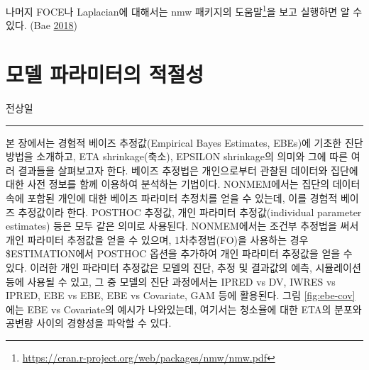 \documentclass[
  11pt,
  krantz2,
  a4paper]{krantz}
\theoremstyle{definition}
\theoremstyle{definition}
\theoremstyle{definition}
\theoremstyle{remark}
\begin{document}
나머지 FOCE나 Laplacian에 대해서는 nmw 패키지의 도움말\footnote{\url{https://cran.r-project.org/web/packages/nmw/nmw.pdf}}을 보고 실행하면 알 수 있다. (Bae \protect\hyperlink{ref-R-nmw}{2018})

\hypertarget{parameters}{%
\chapter{모델 파라미터의 적절성}\label{parameters}}

\Large\hfill

전상일
\normalsize

\begin{center}\rule{0.5\linewidth}{0.5pt}\end{center}

본 장에서는 경험적 베이즈 추정값(Empirical Bayes Estimates, EBEs)에 기초한 진단 방법을 소개하고, ETA shrinkage(축소), EPSILON shrinkage의 의미와 그에 따른 여러 결과들을 살펴보고자 한다. 베이즈 추정법은 개인으로부터 관찰된 데이터와 집단에 대한 사전 정보를 함께 이용하여 분석하는 기법이다. NONMEM에서는 집단의 데이터 속에 포함된 개인에 대한 베이즈 파라미터 추정치를 얻을 수 있는데, 이를 경험적 베이즈 추정값이라 한다. POSTHOC 추정값, 개인 파라미터 추정값(individual parameter estimates) 등은 모두 같은 의미로 사용된다. NONMEM에서는 조건부 추정법을 써서 개인 파라미터 추정값을 얻을 수 있으며, 1차추정법(FO)을 사용하는 경우 \$ESTIMATION에서 POSTHOC 옵션을 추가하여 개인 파라미터 추정값을 얻을 수 있다. 이러한 개인 파라미터 추정값은 모델의 진단, 추정 및 결과값의 예측, 시뮬레이션 등에 사용될 수 있고, 그 중 모델의 진단 과정에서는 IPRED vs DV, IWRES vs IPRED, EBE vs EBE, EBE vs Covariate, GAM 등에 활용된다. 그림 \ref{fig:ebe-cov}에는 EBE vs Covariate의 예시가 나와있는데, 여기서는 청소율에 대한 ETA의 분포와 공변량 사이의 경향성을 파악할 수 있다.
\end{document}
